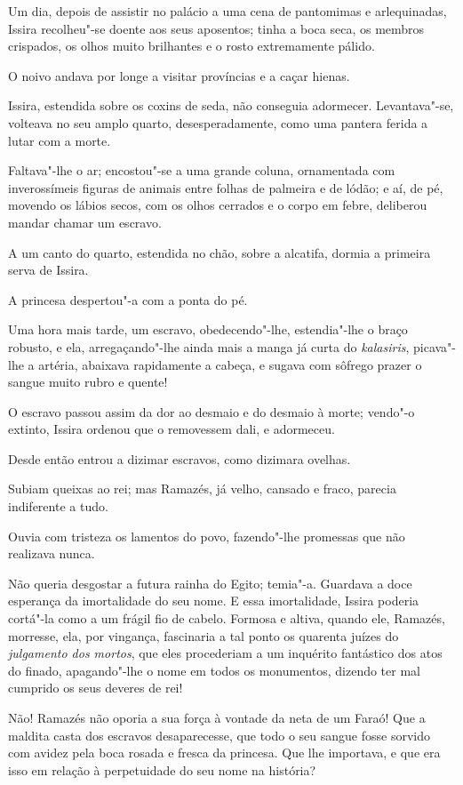 Um dia, depois de assistir no palácio a uma cena de pantomimas e
arlequinadas, Issira recolheu"-se doente aos seus aposentos; tinha a boca
seca, os membros crispados, os olhos muito brilhantes e o rosto
extremamente pálido.

O noivo andava por longe a visitar províncias e a caçar hienas.

Issira, estendida sobre os coxins de seda, não conseguia adormecer.
Levantava"-se, volteava no seu amplo quarto, desesperadamente, como uma
pantera ferida a lutar com a morte.

Faltava"-lhe o ar; encostou"-se a uma grande coluna, ornamentada com
inverossímeis figuras de animais entre folhas de palmeira e de lódão; e
aí, de pé, movendo os lábios secos, com os olhos cerrados e o corpo em
febre, deliberou mandar chamar um escravo.

A um canto do quarto, estendida no chão, sobre a alcatifa, dormia a
primeira serva de Issira.

A princesa despertou"-a com a ponta do pé.

Uma hora mais tarde, um escravo, obedecendo"-lhe, estendia"-lhe o braço
robusto, e ela, arregaçando"-lhe ainda mais a manga já curta do
\emph{kalasiris}, picava"-lhe a artéria, abaixava rapidamente a cabeça, e
sugava com sôfrego prazer o sangue muito rubro e quente!

O escravo passou assim da dor ao desmaio e do desmaio à morte; vendo"-o
extinto, Issira ordenou que o removessem dali, e adormeceu.

Desde então entrou a dizimar escravos, como dizimara ovelhas.

Subiam queixas ao rei; mas Ramazés, já velho, cansado e fraco, parecia
indiferente a tudo.

Ouvia com tristeza os lamentos do povo, fazendo"-lhe promessas que não
realizava nunca.

Não queria desgostar a futura rainha do Egito; temia"-a. Guardava a doce
esperança da imortalidade do seu nome. E essa imortalidade, Issira
poderia cortá"-la como a um frágil fio de cabelo. Formosa e altiva,
quando ele, Ramazés, morresse, ela, por vingança, fascinaria a tal ponto
os quarenta juízes do \emph{julgamento dos mortos}, que eles procederiam
a um inquérito fantástico dos atos do finado, apagando"-lhe o nome em
todos os monumentos, dizendo ter mal cumprido os seus deveres de rei!

Não! Ramazés não oporia a sua força à vontade da neta de um Faraó! Que a
maldita casta dos escravos desaparecesse, que todo o seu sangue fosse
sorvido com avidez pela boca rosada e fresca da princesa. Que lhe
importava, e que era isso em relação à perpetuidade do seu nome na
história?

